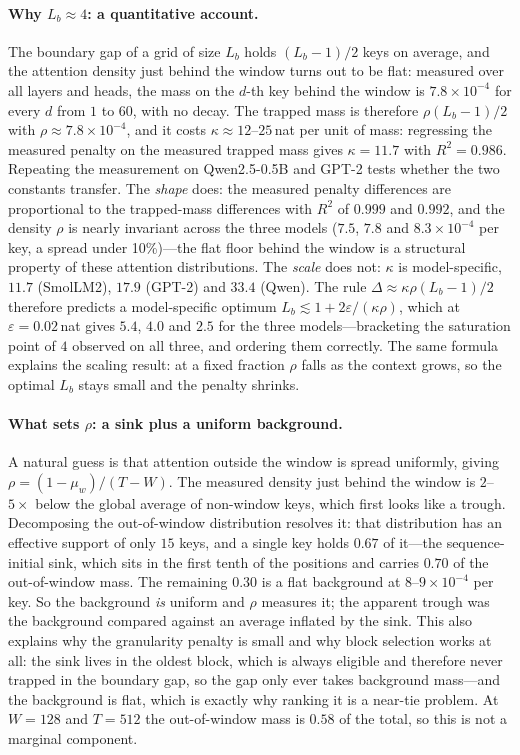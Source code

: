 \documentclass[sigconf,nonacm,11pt]{acmart}
\begin{document}
\paragraph{Why $L_b\approx4$: a quantitative account.} The boundary gap of a grid
of size $L_b$ holds $(L_b-1)/2$ keys on average, and the attention density just
behind the window turns out to be flat: measured over all layers and heads, the
mass on the $d$-th key behind the window is $7.8\times10^{-4}$ for every $d$ from
$1$ to $60$, with no decay. The trapped mass is therefore $\rho(L_b-1)/2$ with
$\rho\approx7.8\times10^{-4}$, and it costs $\kappa\approx12$--$25$\,nat per unit of
mass: regressing the measured penalty on the measured trapped mass gives
$\kappa=11.7$ with $R^2=0.986$. Repeating the measurement on Qwen2.5-0.5B and
GPT-2 tests whether the two constants transfer. The \emph{shape} does: the measured
penalty differences are proportional to the trapped-mass differences with $R^2$ of
$0.999$ and $0.992$, and the density $\rho$ is nearly invariant across the three
models ($7.5$, $7.8$ and $8.3\times10^{-4}$ per key, a spread under 10\%)---the flat
floor behind the window is a structural property of these attention distributions.
The \emph{scale} does not: $\kappa$ is model-specific, $11.7$ (SmolLM2), $17.9$
(GPT-2) and $33.4$ (Qwen). The rule $\Delta\approx\kappa\rho(L_b-1)/2$ therefore
predicts a model-specific optimum $L_b\lesssim1+2\varepsilon/(\kappa\rho)$, which at
$\varepsilon=0.02$\,nat gives $5.4$, $4.0$ and $2.5$ for the three models---bracketing
the saturation point of $4$ observed on all three, and ordering them correctly. The
same formula explains the scaling result: at a fixed fraction $\rho$ falls as the
context grows, so the optimal $L_b$ stays small and the penalty shrinks.

\paragraph{What sets $\rho$: a sink plus a uniform background.} A natural guess is
that attention outside the window is spread uniformly, giving
$\rho=(1-\mu_w)/(T-W)$. The measured density just behind the window is $2$--$5\times$
below the global average of non-window keys, which first looks like a trough.
Decomposing the out-of-window distribution resolves it: that distribution has an
effective support of only $15$ keys, and a single key holds $0.67$ of it---the
sequence-initial sink, which sits in the first tenth of the positions and carries
$0.70$ of the out-of-window mass. The remaining $0.30$ is a flat background at
$8$--$9\times10^{-4}$ per key. So the background \emph{is} uniform and $\rho$ measures
it; the apparent trough was the background compared against an average inflated by
the sink. This also explains why the granularity penalty is small and why block
selection works at all: the sink lives in the oldest block, which is always eligible
and therefore never trapped in the boundary gap, so the gap only ever takes
background mass---and the background is flat, which is exactly why ranking it is a
near-tie problem. At $W=128$ and $T=512$ the out-of-window mass is $0.58$ of the
total, so this is not a marginal component.
\end{document}
